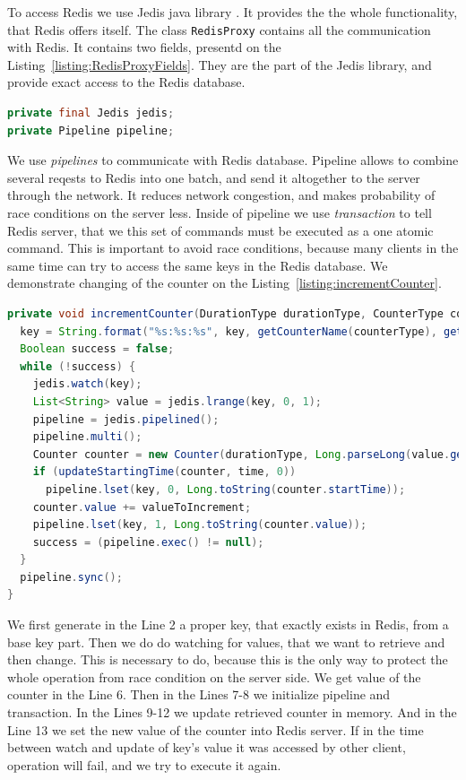 To access Redis we use Jedis java library \cite{Jedis}.
It provides the the whole functionality, that Redis offers itself.
The class \lstinline{RedisProxy} contains all the communication with Redis.
It contains two fields, presentd on the Listing~\ref{listing:RedisProxyFields}.
They are the part of the Jedis library, and provide exact access to the Redis database.

\begin{lstlisting}[float=h, caption=Two main fields of the class RedisProxy., label=listing:RedisProxyFields, language=Java]
private final Jedis jedis;
private Pipeline pipeline;
\end{lstlisting}

We use \textit{pipelines} to communicate with Redis database.
Pipeline allows to combine several reqests to Redis into one batch, and send it altogether to the server through the network.
It reduces network congestion, and makes probability of race conditions on the server less.
Inside of pipeline we use \textit{transaction} to tell Redis server, that we this set of commands must be executed as a one atomic command.
This is important to avoid race conditions, because many clients in the same time can try to access the same keys in the Redis database.
We demonstrate changing of the counter on the Listing~\ref{listing:incrementCounter}.

\begin{lstlisting}[float=h, caption=Example of updating counter aggregation in the Redis database., label=listing:incrementCounter, language=Java]
private void incrementCounter(DurationType durationType, CounterType counterType, String key, long time, long valueToIncrement) {
  key = String.format("%s:%s:%s", key, getCounterName(counterType), getDurationName(durationType));
  Boolean success = false;
  while (!success) {
    jedis.watch(key);
    List<String> value = jedis.lrange(key, 0, 1);
    pipeline = jedis.pipelined();
    pipeline.multi();
    Counter counter = new Counter(durationType, Long.parseLong(value.get(0)), Long.parseLong(value.get(1)));
    if (updateStartingTime(counter, time, 0))
      pipeline.lset(key, 0, Long.toString(counter.startTime));
    counter.value += valueToIncrement;
    pipeline.lset(key, 1, Long.toString(counter.value));
    success = (pipeline.exec() != null);
  }
  pipeline.sync();
}
\end{lstlisting}

We first generate in the Line 2 a proper key, that exactly exists in Redis, from a base key part.
Then we do do watching for values, that we want to retrieve and then change.
This is necessary to do, because this is the only way to protect the whole operation from race condition on the server side.
We get value of the counter in the Line 6.
Then in the Lines 7-8 we initialize pipeline and transaction.
In the Lines 9-12 we update retrieved counter in memory.
And in the Line 13 we set the new value of the counter into Redis server.
If in the time between watch and update of key's value it was accessed by other client, operation will fail, and we try to execute it again.